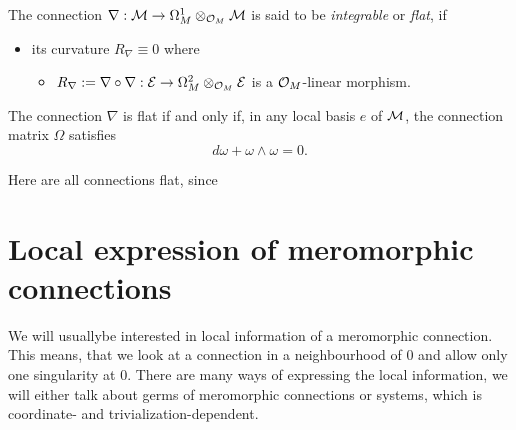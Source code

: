 \begin{defn}
  The connection $\nabla:\mathcal{M}\to \Omega_M^1\otimes_{\mathcal{O}_M}\mathcal{M}$ is said to be
  \emph{integrable} or \emph{flat}, if
  \begin{itemize}
    \item its curvature $R_\nabla\equiv0$
    where
    \begin{itemize}
      \item $R_\nabla:=\nabla\circ\nabla:\mathcal{E}\to\Omega_M^2\otimes_{\mathcal{O}_M}\mathcal{E}$
        is a $\mathcal{O}_M$-linear morphism.
    \end{itemize}
  \end{itemize}
  \begin{prop}[0.12.4]
    The connection $\nabla$ is flat if and only if, in any local basis $e$ of
    $\mathcal{M}$, the connection matrix $\Omega$ satisfies
    \[
      d\omega + \omega \wedge \omega = 0.
    \]
  \end{prop}
  \begin{rem}
    Here are all connections flat, since \TODO{}
  \end{rem}
  \begin{comment}
    We will say that a connection on a meromorphic bundle is \emph{integrable}
    or \emph{flat} if its restriction to $M\backslash Z$ is an integrable
    connection on the holomorphic bundle $\sM_{|M\backslash Z}$.
  \end{comment}
\end{defn}

\section{Local expression of meromorphic connections}
\begin{comment}
  \begin{itemize}
    \item \cite{sabbah2007isomonodromic} p.28
    \item \cite{thboalch} p.2
    \item \cite{babbitt1989local} p. 11
  \end{itemize}
\end{comment}
We will usually\TODO[only?] be interested in local information of a meromorphic
connection.  This means, that we look at a connection in a neighbourhood of $0$
and allow only one singularity at $0$.
There are many ways of expressing the local information, we will either talk
about germs of meromorphic connections or systems, which is coordinate-
and trivialization-dependent.

